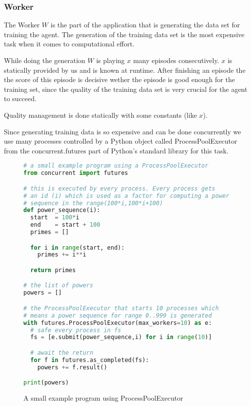 \subsubsection{Worker}
\label{s_worker}

The Worker $W$ is the part of the application that is
generating the data set for training the agent. The
generation of the training data set is the most expensive
task when it comes to computational effort.

While doing the generation $W$ is playing $x$ many episodes
consecutively. $x$ is statically provided by us and is
known at runtime. After finishing an episode the the score
of this episode is decisive wether the episode is good
enough for the training set, since the quality of the
training data set is very crucial for the agent to succeed.

Quality management is done statically with some constants
(like $x$).

Since generating training data is so expensive and can be
done concurrently we use many processes controlled by a
Python object called ProcessPoolExecutor from the
concurrent.futures part of Python's standard library for
this task.

\begin{figure}[H]
\begin{mdframed}[style=codebox]
\begin{lstlisting}[language=Python]
# a small example program using a ProcessPoolExecutor
from concurrent import futures

# this is executed by every process. Every process gets
# an id (i) which is used as a factor for computing a power
# sequence in the range(100*i,100*i+100)
def power_sequence(i):
  start  = 100*i
  end    = start + 100
  primes = []

  for i in range(start, end):
    primes += i**i

  return primes

# the list of powers
powers = []

# the ProcessPoolExecutor that starts 10 processes which
# means a power sequence for range 0..999 is generated
with futures.ProcessPoolExecutor(max_workers=10) as e:
  # safe every process in fs
  fs = [e.submit(power_sequence,i) for i in range(10)]

  # await the return
  for f in futures.as_completed(fs):
    powers += f.result()

print(powers)
\end{lstlisting}
\end{mdframed}
\caption{A small example program using ProcessPoolExecutor}
\end{figure}

